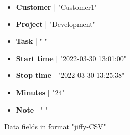 \documentclass[journal]{IEEEtran}
\begin{document}
\begin{figure}[h]

	\begin{itemize}
	
		\item \textbf{Customer} | "Customer1"

		\item \textbf{Project} | "Development"

		\item \textbf{Task} | " "

		\item \textbf{Start time} | "2022-03-30 13:01:00"

		\item \textbf{Stop time} | "2022-03-30 13:25:38"

		\item \textbf{Minutes} | "24"

		\item \textbf{Note} | " "

	\end{itemize}
	\caption{Data fields in format "jiffy-CSV"}
	\label{list:FORMAT1}

\end{figure}
\end{document}
